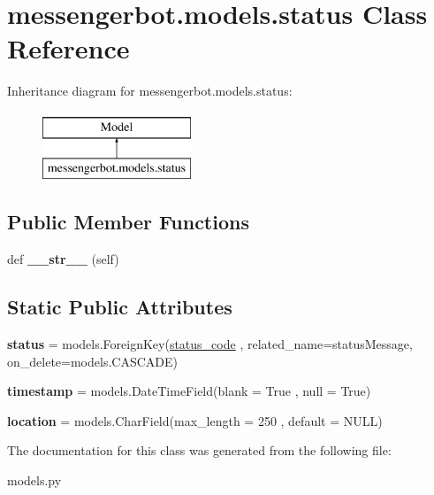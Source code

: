 \hypertarget{classmessengerbot_1_1models_1_1status}{}\section{messengerbot.\+models.\+status Class Reference}
\label{classmessengerbot_1_1models_1_1status}
Inheritance diagram for messengerbot.\+models.\+status\+:\begin{figure}[H]
\begin{center}
\leavevmode
\includegraphics[height=2.000000cm]{classmessengerbot_1_1models_1_1status}
\end{center}
\end{figure}
\subsection*{Public Member Functions}
\begin{DoxyCompactItemize}
\item 
\mbox{\label{classmessengerbot_1_1models_1_1status_a8118d8d2338a4499e11a1edca485732b}} 
def {\bfseries \+\_\+\+\_\+str\+\_\+\+\_\+} (self)
\end{DoxyCompactItemize}
\subsection*{Static Public Attributes}
\begin{DoxyCompactItemize}
\item 
\mbox{\label{classmessengerbot_1_1models_1_1status_a0a3e686172dda050ed397e3c02dd0e90}} 
{\bfseries status} = models.\+Foreign\+Key(\hyperlink{classmessengerbot_1_1models_1_1status__code}{status\+\_\+code} , related\+\_\+name=\textquotesingle{}status\+Message\textquotesingle{}, on\+\_\+delete=models.\+C\+A\+S\+C\+A\+DE)
\item 
\mbox{\label{classmessengerbot_1_1models_1_1status_a63f065ddf8a8fc756041f554c70d90ba}} 
{\bfseries timestamp} = models.\+Date\+Time\+Field(blank = True , null = True)
\item 
\mbox{\label{classmessengerbot_1_1models_1_1status_af9593cfd65b337505e2702a35ada7839}} 
{\bfseries location} = models.\+Char\+Field(max\+\_\+length = 250 , default = \textquotesingle{}N\+U\+LL\textquotesingle{})
\end{DoxyCompactItemize}


The documentation for this class was generated from the following file\+:\begin{DoxyCompactItemize}
\item 
models.\+py\end{DoxyCompactItemize}

